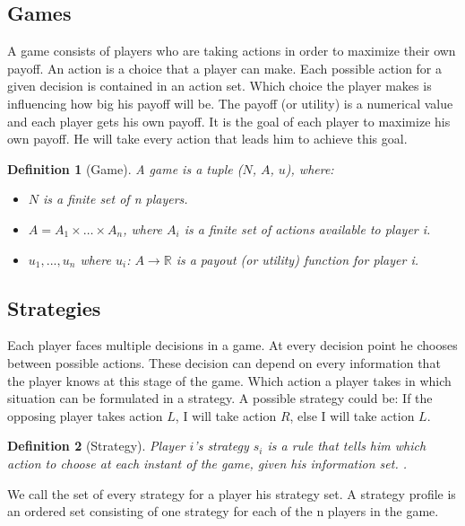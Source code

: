 \documentclass{cacthesis}
\newtheorem{definition}{Definition}
\begin{document}
\subsection{Games}
A game consists of players who are taking actions in order to maximize their own payoff. An action is a choice that a player can make. Each possible action for a given decision is contained in an action set. Which choice the player makes is influencing how big his payoff will be. The payoff (or utility) is a numerical value and each player gets his own payoff. It is the goal of each player to maximize his own payoff. He will take every action that leads him to achieve this goal.
\begin{definition}[Game]
A game is a tuple ($N$, $A$, $u$), where:
\begin{itemize}
    \item $N$ is a finite set of n players.
    \item $A = A_1 \times \dots \times A_n$, where $A_i$ is a finite set of actions available to player i. %
    \item $u_1,...,u_n$ where $u_i$: $A \to \mathbb{R}$ is a payout (or utility) function for player i.
\end{itemize} {\normalfont \cite{leyton-brown_essentials_2008}}
\end{definition}
\subsection{Strategies}
Each player faces multiple decisions in a game. At every decision point he chooses between possible actions. These decision can depend on every information that the player knows at this stage of the game. Which action a player takes in which situation can be formulated in a strategy. A possible strategy could be: If the opposing player takes action $L$, I will take action $R$, else I will take action $L$.\newline

\begin{definition}[Strategy]
Player $i$'s strategy $s_i$ is a rule that tells him which action to choose at each instant of the game, given his information set. {\normalfont \cite{rasmusen_games_nodate}}.
\end{definition}
We call the set of every strategy for a player his strategy set. A strategy profile is an ordered set consisting of one strategy for each of the n players in the game.\newline
\end{document}
